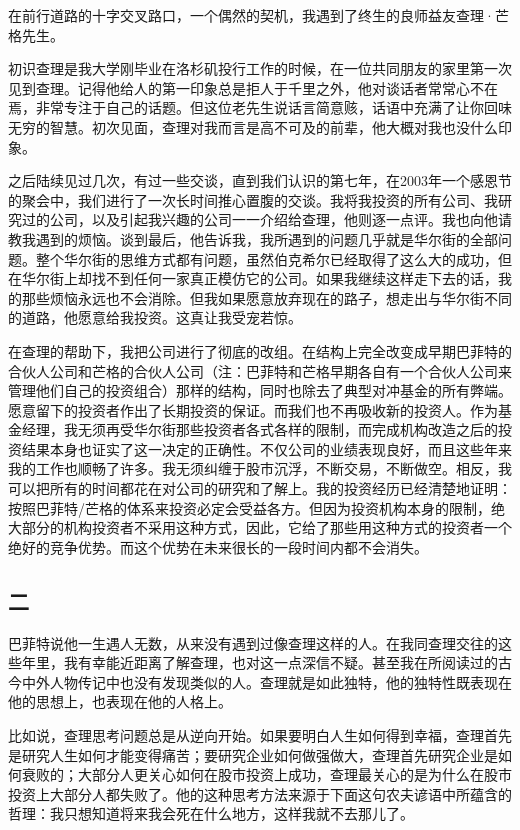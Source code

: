 在前行道路的十字交叉路口，一个偶然的契机，我遇到了终生的良师益友查理·芒格先生。
\par

初识查理是我大学刚毕业在洛杉矶投行工作的时候，在一位共同朋友的家里第一次见到查理。记得他给人的第一印象总是拒人于千里之外，他对谈话者常常心不在焉，非常专注于自己的话题。但这位老先生说话言简意赅，话语中充满了让你回味无穷的智慧。初次见面，查理对我而言是高不可及的前辈，他大概对我也没什么印象。
\par

之后陆续见过几次，有过一些交谈，直到我们认识的第七年，在2003年一个感恩节的聚会中，我们进行了一次长时间推心置腹的交谈。我将我投资的所有公司、我研究过的公司，以及引起我兴趣的公司一一介绍给查理，他则逐一点评。我也向他请教我遇到的烦恼。谈到最后，他告诉我，我所遇到的问题几乎就是华尔街的全部问题。整个华尔街的思维方式都有问题，虽然伯克希尔已经取得了这么大的成功，但在华尔街上却找不到任何一家真正模仿它的公司。如果我继续这样走下去的话，我的那些烦恼永远也不会消除。但我如果愿意放弃现在的路子，想走出与华尔街不同的道路，他愿意给我投资。这真让我受宠若惊。
\par

在查理的帮助下，我把公司进行了彻底的改组。在结构上完全改变成早期巴菲特的合伙人公司和芒格的合伙人公司（注：巴菲特和芒格早期各自有一个合伙人公司来管理他们自己的投资组合）那样的结构，同时也除去了典型对冲基金的所有弊端。愿意留下的投资者作出了长期投资的保证。而我们也不再吸收新的投资人。作为基金经理，我无须再受华尔街那些投资者各式各样的限制，而完成机构改造之后的投资结果本身也证实了这一决定的正确性。不仅公司的业绩表现良好，而且这些年来我的工作也顺畅了许多。我无须纠缠于股市沉浮，不断交易，不断做空。相反，我可以把所有的时间都花在对公司的研究和了解上。我的投资经历已经清楚地证明：按照巴菲特/芒格的体系来投资必定会受益各方。但因为投资机构本身的限制，绝大部分的机构投资者不采用这种方式，因此，它给了那些用这种方式的投资者一个绝好的竞争优势。而这个优势在未来很长的一段时间内都不会消失。
\par

\subsection*{二}

巴菲特说他一生遇人无数，从来没有遇到过像查理这样的人。在我同查理交往的这些年里，我有幸能近距离了解查理，也对这一点深信不疑。甚至我在所阅读过的古今中外人物传记中也没有发现类似的人。查理就是如此独特，他的独特性既表现在他的思想上，也表现在他的人格上。
\par

比如说，查理思考问题总是从逆向开始。如果要明白人生如何得到幸福，查理首先是研究人生如何才能变得痛苦；要研究企业如何做强做大，查理首先研究企业是如何衰败的；大部分人更关心如何在股市投资上成功，查理最关心的是为什么在股市投资上大部分人都失败了。他的这种思考方法来源于下面这句农夫谚语中所蕴含的哲理：我只想知道将来我会死在什么地方，这样我就不去那儿了。
\par


